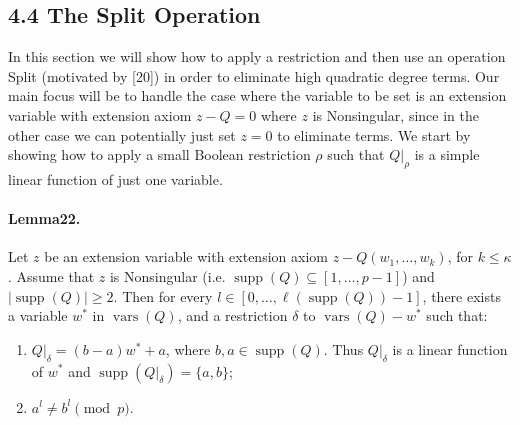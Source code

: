 \documentclass[10pt,a4paper]{article}
\DeclareMathOperator{\supp}{supp}
\DeclareMathOperator{\vars}{vars}
\begin{document}
\subsection*{4.4 The Split Operation}
In this section we will show how to apply a restriction and then use an operation Split (motivated by [20]) in order to eliminate high quadratic degree terms. Our main focus will be to handle the case where the variable to be set is an extension variable with extension axiom $z-Q=0$ where $z$ is Nonsingular, since in the other case we can potentially just set $z=0$ to eliminate terms. We start by showing how to apply a small Boolean restriction $\rho$ such that $Q|_{\rho}$ is a simple linear function of just one variable.
\paragraph{Lemma22.} Let $z$ be an extension variable with extension axiom $z-Q(w_1,\ldots,w_k)$, for $k\leq\kappa$. Assume that $z$ is Nonsingular (i.e. $\supp(Q)\subseteq[1,\ldots,p-1]$) and $|\supp(Q)|\geq2$. Then for every $l\in[0,\ldots,\ell(\supp(Q))-1]$, there exists a variable $w^*$ in $\vars(Q)$, and a restriction $\delta$ to $\vars(Q)-w^*$ such that:
\begin{enumerate}[label=(\arabic*)]
\item $Q|_{\delta}=(b-a)w^*+a$, where $b,a\in\supp(Q)$. Thus $Q|_{\delta}$ is a linear function of $w^*$ and $\supp(Q|_{\delta})=\{a,b\}$;
\item $a^l\neq b^l\pmod p$.
\end{enumerate}
\end{document}
